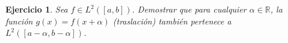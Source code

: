 \documentclass[11pt]{report}
\newtheorem{ex}{Ejercicio}
\newenvironment{solution}{\begin{proof}[Solución]}{\end{proof}}
\newcommand{\Ldos}{L^2}
\begin{document}

\begin{ex}
Sea $f \in \Ldos([a, b])$. Demostrar que para cualquier $\alpha \in \mathbb{R}$, la función $g(x) = f(x + \alpha)$ (traslación) también pertenece a $\Ldos([a - \alpha, b - \alpha])$.
\end{ex}






\end{document}
